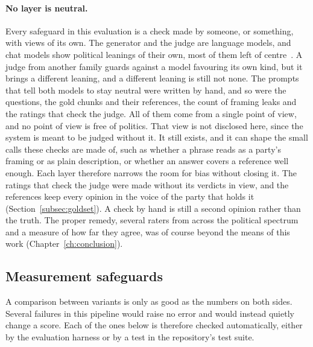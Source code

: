 \paragraph{No layer is neutral.} Every safeguard in this evaluation is a check
made by someone, or something, with views of its own. The generator and the
judge are language models, and chat models show political leanings of their
own, most of them left of centre~\citep{rozado2024political,motoki2024more}. A
judge from another family guards against a model favouring its own kind, but
it brings a different leaning, and a different leaning is still not none. The
prompts that tell both models to stay neutral were written by hand, and so
were the questions, the gold chunks and their references, the count of framing
leaks and the ratings that check the judge. All of them come from a single
point of view, and no point of view is free of politics. That view is not
disclosed here, since the system is meant to be judged without it. It still
exists, and it can shape the small calls these checks are made of, such as whether a phrase reads as a party's framing or as plain
description, or whether an answer covers a reference well enough. Each layer
therefore narrows the room for bias without closing it. The ratings that check
the judge were made without its verdicts in view, and the references keep
every opinion in the voice of the party that holds it
(Section~\ref{subsec:goldset}). A check by hand is still a second opinion
rather than the truth. The proper remedy, several raters from across the
political spectrum and a measure of how far they agree, was of course beyond the means
of this work (Chapter~\ref{ch:conclusion}).

\subsection{Measurement safeguards} \label{subsec:safeguards}
A comparison between variants is only as good as the numbers on both sides.
Several failures in this pipeline would raise no error and would instead
quietly change a score. Each of the ones below is therefore checked
automatically, either by the evaluation harness or by a test in the
repository's test suite.

